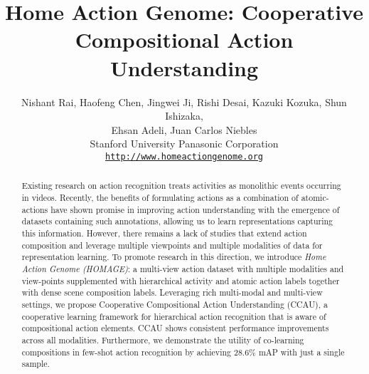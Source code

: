 \documentclass[final]{cvpr}
\begin{document}
\title{Home Action Genome: Cooperative Compositional Action Understanding}

\author{Nishant Rai, Haofeng Chen, Jingwei Ji, Rishi Desai, Kazuki Kozuka, Shun Ishizaka, \\
Ehsan Adeli, Juan Carlos Niebles\\
Stanford University \quad Panasonic Corporation\\
{\tt\small \url{http://www.homeactiongenome.org}}
}

\maketitle

\begin{abstract}
Existing research on action recognition treats activities as monolithic events occurring in videos. Recently, the benefits of formulating actions as a combination of atomic-actions have shown promise in improving action understanding with the emergence of datasets containing such annotations, allowing us to learn representations capturing this information. However, there remains a lack of studies that extend action composition and leverage multiple viewpoints and multiple modalities of data for representation learning.
To promote research in this direction, we introduce \textit{Home Action Genome (HOMAGE)}: a multi-view action dataset with multiple modalities and view-points supplemented with hierarchical activity and atomic action labels together with dense scene composition labels. Leveraging rich multi-modal and multi-view settings, we propose Cooperative Compositional Action Understanding (CCAU), a cooperative learning framework for hierarchical action recognition that is aware of compositional action elements. CCAU shows consistent performance improvements across all modalities. Furthermore, we demonstrate the utility of co-learning compositions in few-shot action recognition by achieving 28.6\% mAP with just a single sample.
\end{abstract}

\vspace{-15pt}
\end{document}
